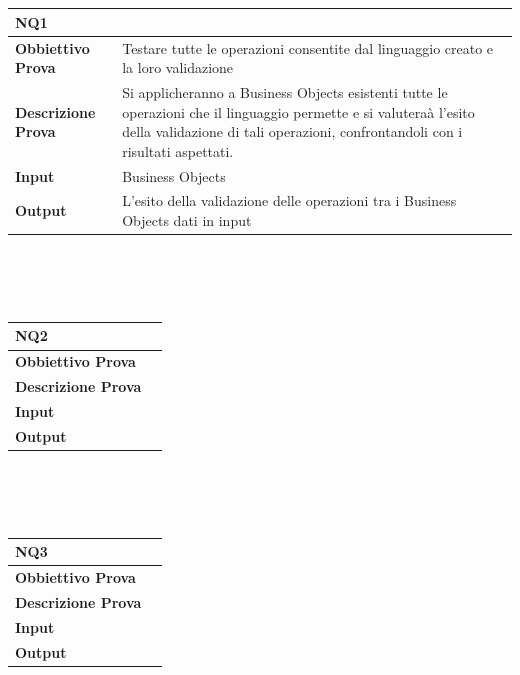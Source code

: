 \documentclass[11pt,titlepage,a4paper]{report}
\begin{document}
\\
\\
\begin{tabular}{||p{4.5cm}||p{7.5cm}||}
\hline
\textbf{\textsf{NQ1}}& \\
\hline
{\textbf{Obbiettivo Prova}}& Testare tutte le operazioni consentite dal linguaggio creato e la loro validazione\\ \hline
{\textbf{Descrizione Prova}}& Si applicheranno a Business Objects esistenti tutte le operazioni che il linguaggio permette e si valutera\`a l'esito della validazione di tali operazioni, confrontandoli con i risultati aspettati.  \\ \hline
{\textbf{Input}}& Business Objects \\ \hline
{\textbf{Output}}& L'esito della validazione delle operazioni tra i Business Objects dati in input\\ \hline
\end{tabular} \\
\\
\\
\begin{tabular}{||p{4.5cm}||p{7.5cm}||}
\hline
\textbf{\textsf{NQ2}}& \\
\hline
{\textbf {Obbiettivo Prova}}& \\ \hline
{\textbf{Descrizione Prova}}&  \\ \hline
{\textbf{Input}}&  \\ \hline
{\textbf{Output}}& \\ \hline
\end{tabular} \\
\\
\\
\begin{tabular}{||p{4.5cm}||p{7.5cm}||}
\hline
\textbf{\textsf{NQ3}}& \\
\hline
{\textbf {Obbiettivo Prova}}& \\ \hline
{\textbf{Descrizione Prova}}&  \\ \hline
{\textbf{Input}}&  \\ \hline
{\textbf{Output}}& \\ \hline
\end{tabular} \\
\end{document}
